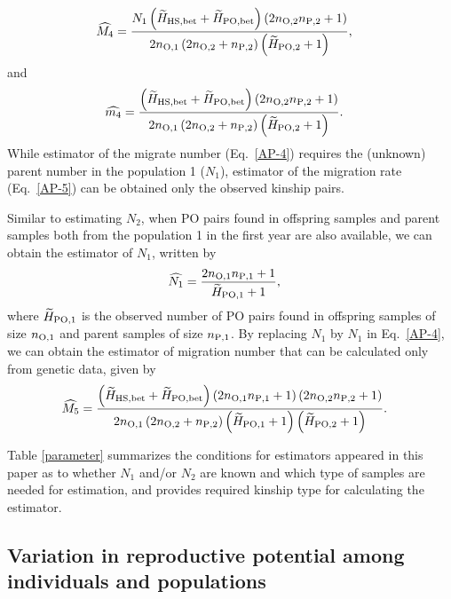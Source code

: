 \documentclass[12pt, English]{article}
\begin{document}
\begin{spacing}{1.9}
\begin{align}
\widehat{M_4} &=  \frac{ N_{1} \left(\widetilde{H}_{\rm HS,bet} + \widetilde{H}_{\rm PO,bet}\right) \left(2 n_{\rm O, 2} n_{\rm P, 2} + 1\right)} {2n_{\rm O, 1} \left(2 n_{\rm O, 2} + n_{\rm P, 2}\right) \left(\widetilde{H}_{\rm PO, 2} + 1\right)},
\label{AP-4}
\end{align}
and
\begin{align}
\widehat{m_4} &=  \frac{ \left(\widetilde{H}_{\rm HS,bet} + \widetilde{H}_{\rm PO,bet}\right) \left(2 n_{\rm O, 2} n_{\rm P, 2} + 1\right)} {2n_{\rm O, 1} \left(2 n_{\rm O, 2} + n_{\rm P, 2}\right) \left(\widetilde{H}_{\rm PO, 2} + 1\right)}.
\label{AP-5}
\end{align}
While estimator of the migrate number (Eq.~\ref{AP-4}) requires the (unknown) parent number in the population 1 ($N_{1}$), estimator of the migration rate (Eq.~\ref{AP-5}) can be obtained only the observed kinship pairs. 

Similar to estimating $N_2$, when PO pairs found in offspring samples and parent samples both from the population 1 in the first year are also available, we can obtain the estimator of $N_1$, written by
\begin{align}
\widehat{N_1} &= \frac{ 2 n_{\rm O, 1} n_{\rm P, 1} + 1 }{\widetilde{H}_{\rm PO, 1} + 1},
\label{AP-6}
\end{align}
where $\widetilde{H}_{\rm PO, 1}$ is the observed number of PO pairs found in offspring samples of size $n_{\rm O, 1}$ and parent samples of size $n_{\rm P, 1}$. By replacing $N_1$ by $\widehat{N_1}$ in Eq.~\ref{AP-4}, we can obtain the estimator of migration number that can be calculated only from genetic data, given by
\begin{align}
\widehat{M_5} &=  \frac{ \left(\widetilde{H}_{\rm HS,bet} + \widetilde{H}_{\rm PO,bet}\right) \left(2 n_{\rm O, 1} n_{\rm P, 1} + 1\right) \left(2 n_{\rm O, 2} n_{\rm P, 2} + 1\right)} {2n_{\rm O, 1} \left(2 n_{\rm O, 2} + n_{\rm P, 2}\right) \left(\widetilde{H}_{\rm PO, 1} + 1\right) \left(\widetilde{H}_{\rm PO, 2} + 1\right)}.
\label{AP-7}
\end{align}

Table \ref{parameter} summarizes the conditions for estimators appeared in this paper as to whether $N_1$ and/or $N_2$ are known and which type of samples are needed for estimation, and provides required kinship type for calculating the estimator. 

\subsection{Variation in reproductive potential among individuals and populations}


\end{spacing}
\end{document}
